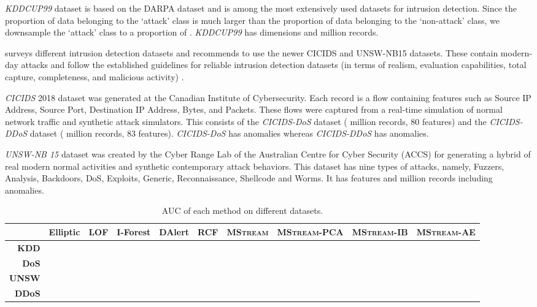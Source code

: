 \documentclass[sigconf]{acmart}
\newcommand{\method}{\textsc{MStream}}
\begin{document}
\emph{KDDCUP99} dataset \cite{KDDCup192:online} is based on the DARPA dataset and is among the most extensively used datasets for intrusion detection. Since the proportion of data belonging to the `attack' class is much larger than the proportion of data belonging to the `non-attack' class, we downsample the `attack' class to a proportion of . \emph{KDDCUP99} has  dimensions and  million records.

\cite{ring2019survey} surveys different intrusion detection datasets and recommends to use the newer CICIDS \cite{sharafaldin2018toward} and UNSW-NB15 \cite{moustafa2015unsw} datasets. These contain modern-day attacks and follow the established guidelines for reliable intrusion detection datasets (in terms of realism, evaluation capabilities, total capture, completeness, and malicious activity) \cite{sharafaldin2018toward}.

\emph{CICIDS} 2018 dataset was generated at the Canadian Institute of Cybersecurity. Each record is a flow containing features such as Source IP Address, Source Port, Destination IP Address, Bytes, and Packets. These flows were captured from a real-time simulation of normal network traffic and synthetic attack simulators. This consists of the \emph{CICIDS-DoS} dataset ( million records, 80 features) and the \emph{CICIDS-DDoS} dataset ( million records, 83 features). \emph{CICIDS-DoS} has  anomalies whereas \emph{CICIDS-DDoS} has  anomalies.

\emph{UNSW-NB 15} dataset was created by the Cyber Range Lab of the Australian Centre for Cyber Security (ACCS) for generating a hybrid of real modern normal activities and synthetic contemporary attack behaviors. This dataset has nine types of attacks, namely, Fuzzers, Analysis, Backdoors, DoS, Exploits, Generic, Reconnaissance, Shellcode and Worms. It has  features and  million records including  anomalies.



\begin{table*}[!htb]
\centering
\caption{AUC of each method on different datasets.}
\label{tab:auc}
\begin{tabular}{@{}rccccccccc@{}}
\toprule
& Elliptic
 & LOF
 & I-Forest
 &  DAlert
 & RCF
 & \textbf{\method}
 & \textbf{\method-PCA}
 & \textbf{\method-IB}
 & \textbf{\method-AE} \\ \midrule
 \textbf{KDD} &  &  &   &  &  &    &  &  &  \\
 \textbf{DoS} &  &  &  &   &  &  &  &  &  \\
  \textbf{UNSW} &  &  &  &  &  &  &  &  &  \\
\textbf{DDoS} &  &  &  &  &  &   &  &  &  \\
\bottomrule
\end{tabular}
\end{table*}
\end{document}
